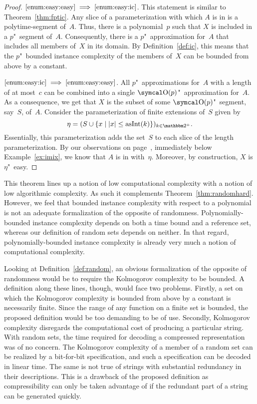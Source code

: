 \begin{proof}
$\ref{enum:easy:easy} \implies \ref{enum:easy:ic}$.
  This statement is similar to Theorem~\ref{thm:fptic}.
  Any slice of a parameterization with which $A$ is in  is a polytime-segment of~$A$.
  Thus, there is a polynomial~$p$ such that $X$ is included in a $p$"~segment of~$A$.
  Consequently, there is a $p$"~approximation for~$A$ that includes all members of~$X$ in its domain.
  By Definition~\ref{def:ic}, this means that the $p$"~bounded instance complexity of the members of~$X$ can be bounded from above by a constant.

$\ref{enum:easy:ic} \implies \ref{enum:easy:easy}$.
  All $p$"~approximations for~$A$ with a length of at most~$c$ can be combined into a single $\bigO(p)$"~approximation for~$A$.
  As a consequence, we get that $X$ is the subset of some $\bigO(p)$"~segment, say~$S$, of~$A$.
  Consider the parameterization of finite extensions of~$S$ given by
  \begin{equation*}
    \eta \deq (S \cup \{x \st \length{x} \le \asNat(k)\})_{k \in \binary^+}.
  \end{equation*}
  Essentially, this parameterization adds the set~$S$ to each slice of the length parameterization.
  By our observations on page~\pageref{p:imix}, immediately below Example~\ref{ex:imix}, we know that $A$ is in  with~$\eta$.
  Moreover, by construction, $X$ is $\eta$"~easy.
\end{proof}

This theorem lines up a notion of low computational complexity with a notion of low algorithmic complexity.
As such it complements Theorem~\ref{thm:randomhard}.
However, we feel that bounded instance complexity with respect to a polynomial is not an adequate formalization of the opposite of randomness.
Polynomially-bounded instance complexity depends on both a time bound and a reference set, whereas our definition of random sets depends on neither.
In that regard, polynomially-bounded instance complexity is already very much a notion of computational complexity.

Looking at Definition~\ref{def:random}, an obvious formalization of the opposite of randomness would be to require the Kolmogorov complexity to be bounded.
A definition along these lines, though, would face two problems.
Firstly, a set on which the Kolmogorov complexity is bounded from above by a constant is necessarily finite.
Since the range of any function on a finite set is bounded, the proposed definition would be too demanding to be of use.
Secondly, Kolmogorov complexity disregards the computational cost of producing a particular string.
With random sets, the time required for decoding a compressed representation was of no concern.
The Kolmogorov complexity of a member of a random set can be realized by a bit-for-bit specification, and such a specification can be decoded in linear time.
The same is not true of strings with substantial redundancy in their descriptions.
This is a drawback of the proposed definition as compressibility can only be taken advantage of if the redundant part of a string can be generated quickly.

